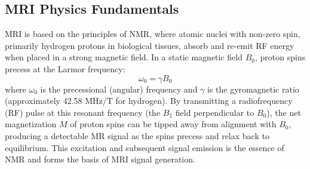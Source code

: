\subsection{MRI Physics Fundamentals}

MRI is based on the principles of NMR, where atomic nuclei with non-zero spin, primarily hydrogen protons in biological tissues, absorb and re-emit RF energy when placed in a strong magnetic field. In a static magnetic field \(B_0\), proton spins precess at the Larmor frequency:
\begin{equation}
\omega_0 = \gamma B_0
\end{equation}
where \( \omega_0 \) is the precessional (angular) frequency and \( \gamma \) is the gyromagnetic ratio (approximately 42.58 MHz/T for hydrogen). By transmitting a radiofrequency (RF) pulse at this resonant frequency (the $B_1$ field perpendicular to $B_0$), the net magnetization $M$ of proton spins can be tipped away from alignment with $B_0$, producing a detectable MR signal as the spins precess and relax back to equilibrium. This excitation and subsequent signal emission is the essence of NMR and forms the basis of MRI signal generation.

